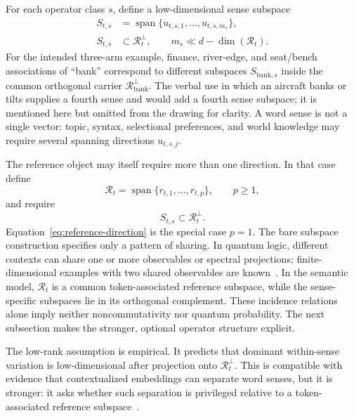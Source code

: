 \documentclass[
  aps,
  reprint,
  superscriptaddress,
  floatfix,
  nofootinbib,
  longbibliography
]{revtex4-2}
\DeclareMathOperator{\spanop}{span}
\begin{document}
For each operator class $s$, define a low-dimensional sense subspace
%
\begin{equation}
\label{eq:sense-subspace}
\begin{aligned}
S_{t,s}&=\spanop\{u_{t,s,1},\dots,u_{t,s,m_s}\},\\
S_{t,s}&\subset\mathcal R_t^\perp,
\qquad m_s\ll d-\dim(\mathcal R_t) .
\end{aligned}
\end{equation}
%
For the intended three-arm example, finance, river-edge, and seat/bench
associations of ``bank'' correspond to different subspaces
$S_{\mathrm{bank},s}$ inside the common orthogonal carrier
$\mathcal R_{\mathrm{bank}}^\perp$.  The verbal use in which an aircraft
banks or tilts supplies a fourth sense and would add a fourth sense
subspace; it is mentioned here but omitted from the drawing for clarity.  A
word sense is not a single vector: topic, syntax, selectional preferences,
and world knowledge may require several spanning directions $u_{t,s,j}$.

The reference object may itself require more than one direction. In that
case define
%
\begin{equation}
\label{eq:reference-subspace}
\mathcal R_t=
\spanop\{r_{t,1},\dots,r_{t,p}\},
\qquad p\ge1,
\end{equation}
%
and require
%
\begin{equation}
\label{eq:multi-sense-subspace}
S_{t,s}\subset\mathcal R_t^\perp .
\end{equation}
%
Equation~\eqref{eq:reference-direction} is the special case $p=1$.
The bare subspace construction specifies only a pattern of sharing. In
quantum logic, different contexts can share one or more observables or
spectral projections; finite-dimensional examples with two shared
observables are known~\cite{svozil:040102}. In the semantic model,
$\mathcal R_t$ is a common token-associated reference subspace, while the
sense-specific subspaces lie in its orthogonal complement. These incidence
relations alone imply neither noncommutativity nor quantum probability. The
next subsection makes the stronger, optional operator structure explicit.

The low-rank assumption is empirical. It predicts that dominant
within-sense variation is low-dimensional after projection onto
$\mathcal R_t^\perp$. This is compatible with evidence that contextualized
embeddings can separate word senses, but it is stronger: it asks whether
such separation is privileged relative to a token-associated reference
subspace~\cite{wiedemann2019does,scarlini2020ares}.
\end{document}
